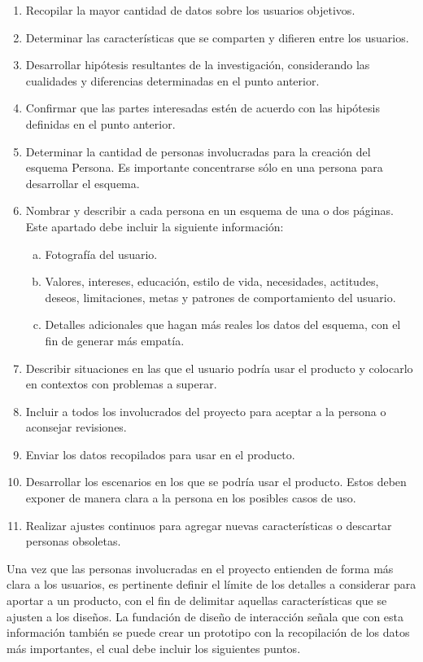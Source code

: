 \begin{enumerate}
  \item Recopilar la mayor cantidad de datos sobre los usuarios objetivos.
  \item Determinar las características que se comparten y difieren entre los usuarios.
  \item Desarrollar hipótesis resultantes de la investigación, considerando las cualidades y diferencias determinadas en el punto anterior.
  \item Confirmar que las partes interesadas estén de acuerdo con las hipótesis definidas en el punto anterior.
  \item Determinar la cantidad de personas involucradas para la creación del esquema Persona. Es importante concentrarse sólo en una persona para desarrollar el esquema.
  \item Nombrar y describir a cada persona en un esquema de una o dos páginas. Este apartado debe incluir la siguiente información:
  \begin{enumerate}[a)]
    \item Fotografía del usuario.
    \item Valores, intereses, educación, estilo de vida, necesidades, actitudes, deseos, limitaciones, metas y patrones de comportamiento del usuario.
    \item Detalles adicionales que hagan más reales los datos del esquema, con el fin de generar más empatía.
  \end{enumerate}
  \item Describir situaciones en las que el usuario podría usar el producto y colocarlo en contextos con problemas a superar.
  \item Incluir a todos los involucrados del proyecto para aceptar a la persona o aconsejar revisiones.
  \item Enviar los datos recopilados para usar en el producto.
  \item Desarrollar los escenarios en los que se podría usar el producto. Estos deben exponer de manera clara a la persona en los posibles casos de uso.
  \item Realizar ajustes continuos para agregar nuevas características o descartar personas obsoletas.
\end{enumerate}

Una vez que las personas involucradas en el proyecto entienden de forma más clara a los usuarios, es pertinente definir el límite de los detalles a considerar para aportar a un producto, con el fin de delimitar aquellas características que se ajusten a los diseños. La fundación de diseño de interacción señala que con esta información también se puede crear un prototipo con la recopilación de los datos más importantes, el cual debe incluir los siguientes puntos.

